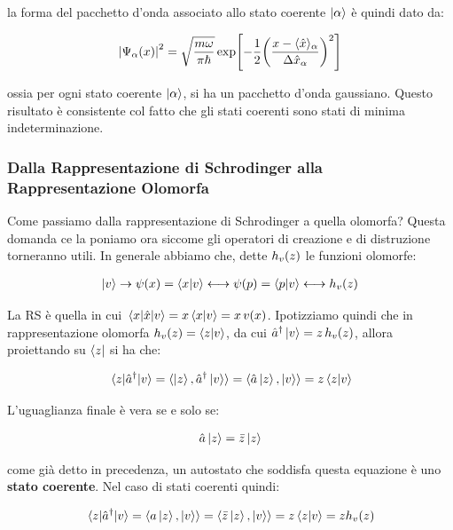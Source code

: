 	la forma del pacchetto d'onda associato allo stato coerente $\ket{\alpha}$ è quindi dato da:
	
\begin{align*}
	\qty|\Psi_{\alpha}\qty(x)|^2 = \sqrt{\frac{m \omega}{\pi \hbar}} \, \text{exp} \qty[ - \frac{1}{2} \qty(\frac{x - \langle \hat{x} \rangle_{\alpha}}{ \Delta \hat{x}_{\alpha}})^2]
\end{align*}
	
	ossia per ogni stato coerente $\ket{\alpha}$, si ha un pacchetto d'onda gaussiano. Questo risultato è consistente col fatto che gli stati coerenti sono stati di minima indeterminazione.

\subsubsection{Dalla Rappresentazione di Schrodinger alla Rappresentazione Olomorfa}

	Come passiamo dalla rappresentazione di Schrodinger a quella olomorfa? Questa domanda ce la poniamo ora siccome gli operatori di creazione e di distruzione torneranno utili. In generale abbiamo che, dette $h_v\qty(z)$ le funzioni olomorfe:
	
\begin{align*}
	\ket{v} \to \psi\qty(x) = \braket{x}{v} \longleftrightarrow \psi\qty(p) = \braket{p}{v} \longleftrightarrow h_v\qty(z)
\end{align*}

	La RS è quella in cui $\mel{x}{\hat{x}}{v} = x \braket{x}{v} = x\, v\qty(x)$. Ipotizziamo quindi che in rappresentazione olomorfa $h_v\qty(z) = \braket{z}{v}$, da cui $\hat{a}^{\dagger}\ket{v} = z \, h_v\qty(z)$, allora proiettando su $\bra{z}$ si ha che:
	
\begin{align*}
	\mel{z}{\hat{a}^{\dagger}}{v} = \langle \ket{z}, \hat{a}^{\dagger} \ket{v} \rangle = \langle \hat{a} \ket{z}, \ket{v} \rangle = z \braket{z}{v}
\end{align*}

	L'uguaglianza finale è vera se e solo se:
	
\begin{align*}
	\hat{a} \ket{z} = \bar{z} \ket{z}
\end{align*}
 
 	come già detto in precedenza, un autostato che soddisfa questa equazione è uno \textbf{stato coerente}. Nel caso di stati coerenti quindi:
	
\begin{align*}
	\mel{z}{\hat{a}^{\dagger}}{v} = \langle a \ket{z}, \ket{v} \rangle =  \langle  \bar{z} \ket{z}, \ket{v}  \rangle = z \braket{z}{v} = z h_v\qty(z)
\end{align*}

